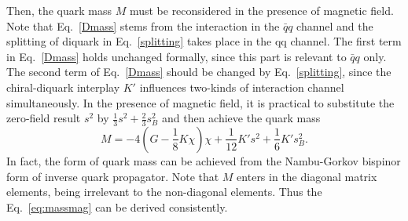 \documentclass[prd, showpacs,nofootinbib,amsmath,amssymb,12pt]{revtex4}
\begin{document}
Then, the  quark mass $M$ must be reconsidered in the presence of magnetic field.
Note that Eq.~\eqref{Dmass} stems from the interaction in the $\bar{q}q$ channel and the splitting of diquark in Eq.~\eqref{splitting} takes place in the qq channel. The first term in Eq.~\eqref{Dmass} holds unchanged formally, since this part is relevant to $\bar{q}q$ only.
The second term of Eq.~\eqref{Dmass} should be changed by Eq.~\eqref{splitting}, since the chiral-diquark interplay $K'$ influences two-kinds of interaction channel simultaneously.
In the presence of magnetic field, it is practical to substitute the zero-field result $s^2$ by $\frac{1}{3}s^2+\frac{2}{3}s^2_{B}$ and then achieve the quark mass
\begin{equation}
\label{eq:massmag}
M=-4(G-\frac{1}{8}K\chi)\chi+\frac{1}{12}K's^2+\frac{1}{6}K's^2_B.
\end{equation}
In fact, the form of quark mass can be achieved from the   Nambu-Gorkov bispinor form of inverse quark propagator.
Note that $M$ enters in the diagonal matrix elements, being irrelevant to the non-diagonal elements.
Thus the Eq.~\eqref{eq:massmag} can be derived consistently.
\end{document}
